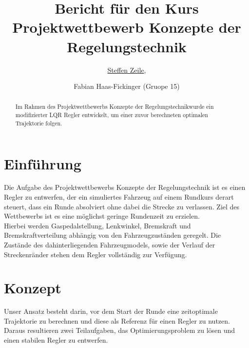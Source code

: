 \documentclass[pdf]{ifacconf}
\begin{document}
\begin{frontmatter}

\title{Bericht für den Kurs \glqq Projektwettbewerb Konzepte der Regelungstechnik\grqq}


\author{\underline{Steffen Zeile},} 
\author{Fabian Haas-Fickinger (Gruope 15)} 

\begin{abstract}                          %
Im Rahmen des \glqq Projektwettbewerbs Konzepte der Regelungstechnik\grqq  wurde ein modifizierter LQR Regler entwickelt, um einer zuvor berechneten optimalen Trajektorie folgen.\end{abstract}

\end{frontmatter}

\section{Einführung}
Die Aufgabe des Projektwettbewerbs Konzepte der Regelungstechnik ist es einen Regler zu entwerfen, der ein simuliertes Fahrzeug auf einem Rundkurs derart steuert, dass ein Runde absolviert ohne dabei die Strecke zu verlassen. Ziel des Wettbewerbs ist es eine möglichst geringe Rundenzeit zu erzielen.\\
Hierbei werden Gaspedalstellung, Lenkwinkel, Bremskraft und Bremskraftverteilung abhängig von den Fahrzeugzuständen geregelt. Die Zustände des dahinterliegenden Fahrzeugmodels, sowie der Verlauf der Streckenränder stehen dem Regler vollständig zur Verfügung.

\section{Konzept}
Unser Ansatz besteht darin, vor dem Start der Runde eine zeitoptimale Trajektorie zu berechnen und diese als Referenz für einen Regler zu nutzen. Daraus resultieren zwei Teilaufgaben, das Optimierungsproblem zu lösen und einen stabilen Regler zu entwerfen.
\end{document}
